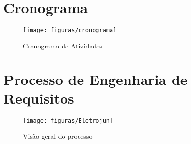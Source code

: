 \begin{apendicesenv}
\partapendices
\chapter{Cronograma}
\FloatBarrier
\begin{figure}[!htpd]
		\centering
		\texttt{[image: figuras/cronograma]}
		\label{img:cronograma}
		\caption{Cronograma de Atividades}
\end{figure}
\chapter{Processo de Engenharia de Requisitos}
\FloatBarrier
\begin{figure}[!htpd]
		\centering
		\texttt{[image: figuras/Eletrojun]}
		\label{img:processoeletrojun}
		\caption{Visão geral do processo}
\end{figure}
\FloatBarrier
\end{apendicesenv}
